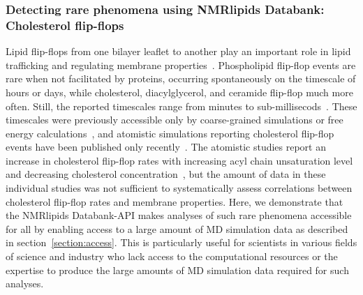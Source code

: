 \documentclass[fleqn,10pt]{wlscirep}
\begin{document}

\subsubsection{Detecting rare phenomena using NMRlipids Databank: Cholesterol flip-flops}
Lipid flip-flops from one bilayer leaflet to another play an important role in lipid trafficking and regulating membrane properties~\cite{vanmeer08}. Phospholipid flip-flop events are rare when not facilitated by proteins, occurring spontaneously on the timescale of hours or days, while cholesterol, diacylglycerol, and ceramide flip-flop much more often. Still, the reported timescales range from minutes to sub-millisecods~\cite{vanmeer08,steck12,parisio16,gu19}. These timescales were previously accessible only by coarse-grained simulations or free energy calculations~\cite{parisio16}, and atomistic simulations reporting cholesterol flip-flop events have been published only recently~\cite{gu19,javanainen19,baral20}. The atomistic studies report an increase in cholesterol flip-flop rates with increasing acyl chain unsaturation level and decreasing cholesterol concentration~\cite{gu19,javanainen19}, but the amount of data in these individual studies was not sufficient to systematically assess correlations between cholesterol flip-flop rates and membrane properties. Here, we demonstrate that the NMRlipids Databank-API makes analyses of such rare phenomena accessible for all by enabling access to a large amount of MD simulation data as described in section~\ref{section:access}. This is particularly useful for scientists in various fields of science and industry who lack access to the computational resources or the expertise to produce the large amounts of MD simulation data required for such analyses. 
\end{document}
